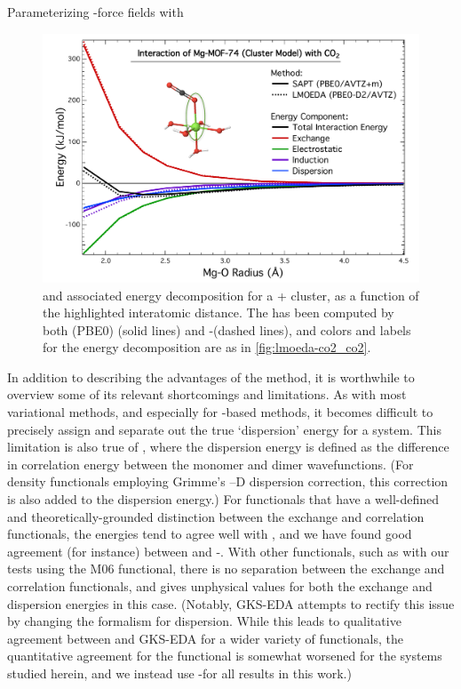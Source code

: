 \begin{section}{Parameterizing \cus-\mof force fields with \lmoeda}
    \begin{figure}
    \centering
    \includegraphics[width=1.0\textwidth]{lmoeda/co2_mgmof_pes.pdf}
    \caption[\lmoeda vs. \sapt \pes for the \co/\mgmof dimer ]
{\pes and associated energy decomposition for a \co +  cluster, 
as a function of the highlighted  interatomic distance. 
The \pes has been
computed by both \dftsapt(PBE0) (solid lines) and \lmoeda-\pbeod (dashed
lines), and colors and labels for the energy decomposition are as in
\cref{fig:lmoeda-co2_co2}. 
            }
    \label{fig:lmoeda-co2_mgmof}
    \end{figure}

In addition to describing the advantages of the \lmoeda method, it is worthwhile to overview
some of its relevant shortcomings and limitations. 
As with most variational \eda methods,\cite{Pastorczak2017} and especially for
\dft-based methods, it becomes difficult to precisely assign and separate out the true
`dispersion' energy for a system. This limitation is also true of \lmoeda,
where the dispersion energy is defined as the difference in correlation energy
between the monomer and dimer wavefunctions. (For density functionals employing
Grimme's --D dispersion correction, this correction is also added to the
\lmoeda dispersion energy.) For functionals that have a well-defined and
theoretically-grounded distinction between the exchange and correlation
functionals, the \lmoeda energies tend to agree well with \sapt, and we have
found good agreement (for instance) between \sapt and \lmoeda-\pbeod. With other
functionals, such as with our tests using the M06 functional, there is no
separation between the exchange and correlation functionals, and \lmoeda gives
unphysical values for both the exchange and dispersion energies in this case.
(Notably, GKS-EDA attempts to rectify this issue by changing the \lmoeda formalism for
dispersion. While this leads to qualitative agreement between \sapt and
GKS-EDA for a wider variety of functionals, the quantitative agreement for the
\pbeod functional is somewhat worsened for the systems studied herein, and we
instead use \lmoeda-\pbeod for all results in this work.)


\end{section}
